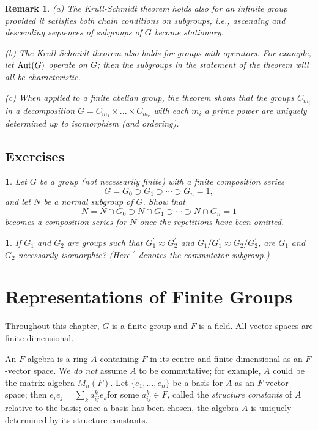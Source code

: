 \documentclass[a4paper,11pt,final,openany]{memoir}%
\newtheorem{remark}[X]{Remark}
\newtheorem{exercise}[Y]{}
\theoremstyle{nonumberplain}
\begin{document}
\begin{remark}
\label{ns31}(a) The Krull-Schmidt theorem holds also for an infinite group
provided it satisfies both chain conditions on subgroups, i.e., ascending and
descending sequences of subgroups of $G$ become stationary.

(b) The Krull-Schmidt theorem also holds for groups with operators. For
example, let $\operatorname{Aut}(G)$ operate on $G$; then the subgroups in the statement of
the theorem will all be characteristic.

(c) When applied to a finite abelian group, the theorem shows that the groups
$C_{m_{i}}$ in a decomposition $G=C_{m_{1}}\times...\times C_{m_{r}}$ with
each $m_{i}$ a prime power are uniquely determined up to isomorphism (and ordering).
\end{remark}

\section{Exercises}

\begin{exercise}
\label{x33a} Let $G$ be a group (not necessarily finite) with a finite
composition series%
\[
G=G_{0}\supset G_{1}\supset\cdots\supset G_{n}=1,
\]
and let $N$ be a normal subgroup of $G$. Show that%
\[
N=N\cap G_{0}\supset N\cap G_{1}\supset\cdots\supset N\cap G_{n}=1
\]
becomes a composition series for $N$ once the repetitions have been omitted.
\end{exercise}

\begin{exercise}
\label{x34}If $G_{1}$ and $G_{2}$ are groups such that $G_{1}^{\prime}\approx
G_{2}^{\prime}$ and $G_{1}/G_{1}^{\prime}\approx G_{2}/G_{2}^{\prime}$, are
$G_{1}$ and $G_{2}$ necessarily isomorphic? (Here $^{\prime}$ denotes the
commutator subgroup.)
\end{exercise}

\clearpage


\chapter{Representations of Finite Groups}

Throughout this chapter, $G$ is a finite group and $F$ is a field. All vector
spaces are finite-dimensional.

An $F$-algebra is a ring $A$ containing $F$ in its centre and finite
dimensional as an $F$-vector space. We \textit{do not} assume $A$ to be
commutative; for example, $A$ could be the matrix algebra $M_{n}(F)$. Let
$\{e_{1},\ldots,e_{n}\}$ be a basis for $A$ as an $F$-vector space; then
$e_{i}e_{j}=\sum\nolimits_{k}a_{ij}^{k}e_{k}$for some $a_{ij}^{k}\in F$,
called the \textit{structure constants} of $A$ relative to the basis; once a
basis has been chosen, the algebra $A$ is uniquely determined by its structure constants.
\end{document}

